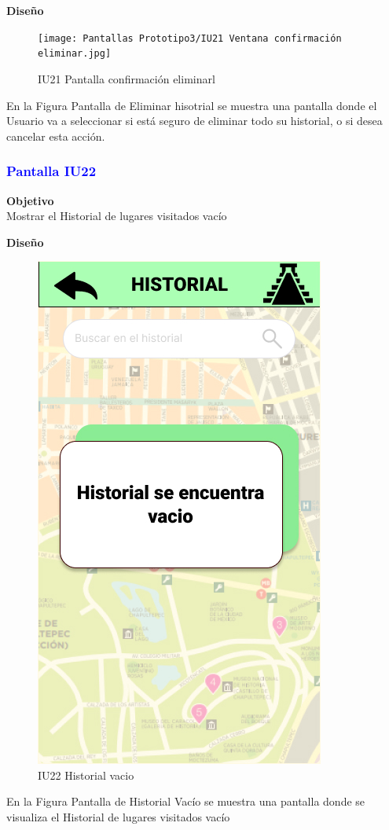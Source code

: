 \textbf{Diseño}

    \begin{figure}[h]
        
            \centering
            \texttt{[image: Pantallas Prototipo3/IU21 Ventana confirmación eliminar.jpg]}
            \caption{IU21 Pantalla confirmación eliminarl}
    
    \end{figure}

En la Figura Pantalla de Eliminar hisotrial se muestra una pantalla donde el Usuario va a seleccionar si está seguro de eliminar todo su historial, o si desea cancelar esta acción. 


\newpage
\subsubsection{\textcolor{blue}{Pantalla IU22 }}

\textbf{Objetivo} \\
Mostrar el Historial de lugares visitados vacío
\vspace{15pt}

\textbf{Diseño}

    \begin{figure}[htbp]
        
            \centering
            \includegraphics[width=.4\linewidth]{Pantallas Prototipo3/IU22 Historial vacio.jpg}
            \caption{IU22 Historial vacio}
    
    \end{figure}

En la Figura Pantalla de Historial Vacío se muestra una pantalla donde se visualiza el Historial de lugares visitados vacío

